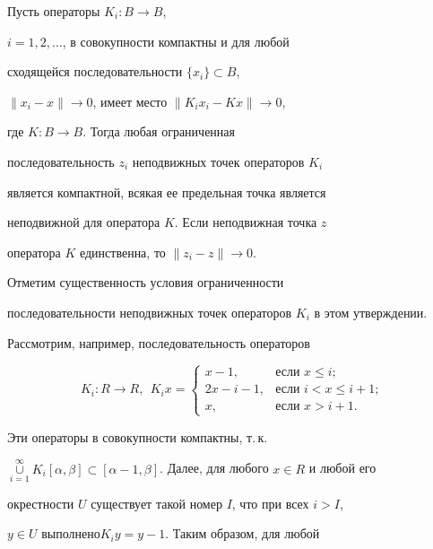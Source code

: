 \begin{lem}


Пусть операторы $K_{i}:B \to B$,


$i=1, 2, \dotsc$, в совокупности компактны и для любой


сходящейся последовательности $\{x_i\} \subset B$,


$\|x_i-x\|\to 0$, имеет место $\|K_i x_i - K x\|\to 0$,


где $K:B \to B$. Тогда любая ограниченная


последовательность $z_i$ неподвижных точек операторов $K_{i}$


является компактной, всякая ее предельная точка является


неподвижной для оператора $K$. Если неподвижная точка $z$


оператора $K $ единственна, то $\|z_i -z\|\to 0$.


\end{lem}





Отметим существенность условия ограниченности


последовательности неподвижных точек операторов $K_{i}$ в этом утверждении.


Рассмотрим, например, последовательность операторов


$$


K_{i}:R\to R,\ \ K_{i}x=


\begin{cases}


x-1,&\text{если } x\leqslant i;\\


2x-i-1,&\text{если } i<x\leqslant i+1;\\


x,&\text{если } x>i+1.


\end{cases}


$$


Эти операторы в совокупности компактны, т.\,к.


$\mathop{\cup}\limits_{i=1}^\infty K_{i} [\alpha, \beta]\subset


[\alpha-1, \beta]$. Далее, для любого $x\in R$ и любой его


окрестности $U$ существует такой номер $I$, что при всех $i>I$,


$y\in U$ выполнено\linebreak $K_{i}y=y-1$. Таким образом, для любой


